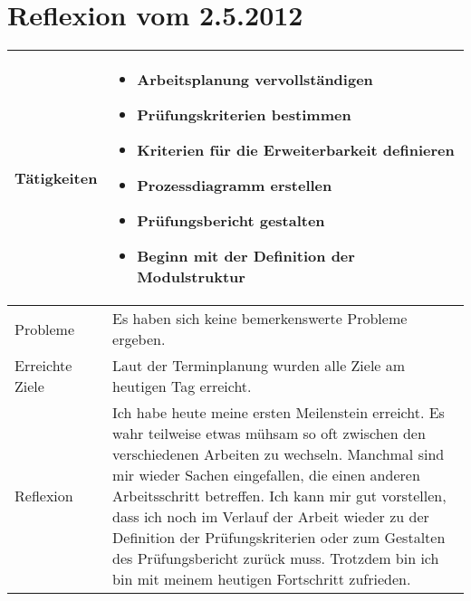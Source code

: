 
\begin{table}
\section{Reflexion vom 2.5.2012}
\begin{tabular}{| l | p{12cm} |}
    \hline
    Tätigkeiten &
    \begin{itemize}
    \item Arbeitsplanung vervollständigen
    \item Prüfungskriterien bestimmen
    \item Kriterien für die Erweiterbarkeit definieren
    \item Prozessdiagramm erstellen
    \item Prüfungsbericht gestalten
    \item Beginn mit der Definition der Modulstruktur
\end{itemize}  \\
    \hline
    Probleme & 
    Es haben sich keine bemerkenswerte Probleme ergeben. \\
    \hline
    Erreichte Ziele &
    Laut der Terminplanung wurden alle Ziele am heutigen Tag erreicht. \\
    \hline 
    Reflexion &
    Ich habe heute meine ersten Meilenstein erreicht. Es wahr teilweise etwas mühsam so oft zwischen den verschiedenen Arbeiten zu wechseln. Manchmal sind mir wieder Sachen eingefallen, die einen anderen Arbeitsschritt betreffen. Ich kann mir gut vorstellen, dass ich noch im Verlauf der Arbeit wieder zu der Definition der Prüfungskriterien oder zum Gestalten des Prüfungsbericht zurück muss. Trotzdem bin ich bin mit meinem heutigen Fortschritt zufrieden. \\
    \hline
\end{tabular}
\end{table}

\clearpage
